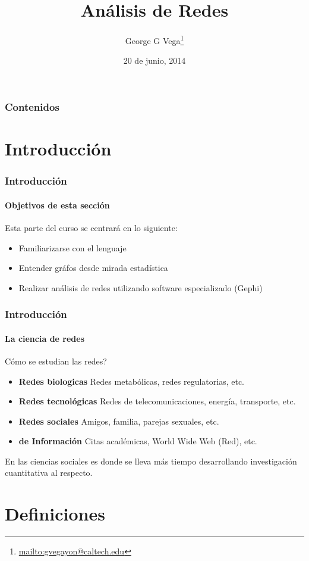 \documentclass{beamer}
\author{George G Vega\thanks{\url{mailto:gvegayon@caltech.edu}}}
\institute{Superintendencia de Pensiones}
\title{An\'alisis de Redes}
\date{20 de junio, 2014}
\begin{document}
\frame{\maketitle}

\begin{frame}
\frametitle{Contenidos}
\tableofcontents
\end{frame}

\section{Introducci\'on}

\begin{frame}
\frametitle{Introducci\'on}
\framesubtitle{Objetivos de esta secci\'on}

Esta parte del curso se centrar\'a en lo siguiente:

\begin{itemize}
\item Familiarizarse con el lenguaje
\item Entender gr\'afos desde mirada estad\'istica
\item Realizar an\'alisis de redes utilizando software especializado (Gephi)
\end{itemize}

\end{frame}

\begin{frame}
\frametitle{Introducci\'on}
\framesubtitle{La ciencia de redes}

C\'omo se estudian las redes?

\begin{itemize}
\item {\bf Redes biologicas} Redes metab\'olicas, redes regulatorias, etc.
\item {\bf Redes tecnol\'ogicas} Redes de telecomunicaciones, energ\'ia, transporte, etc.
\item {\bf Redes sociales} Amigos, familia, parejas sexuales, etc.
\item {\bf de Informaci\'on} Citas acad\'emicas, World Wide Web (Red), etc.
\end{itemize}

En las ciencias sociales es donde se lleva m\'as tiempo desarrollando
investigaci\'on cuantitativa al respecto.

\end{frame}

\section{Definiciones}
\end{document}
